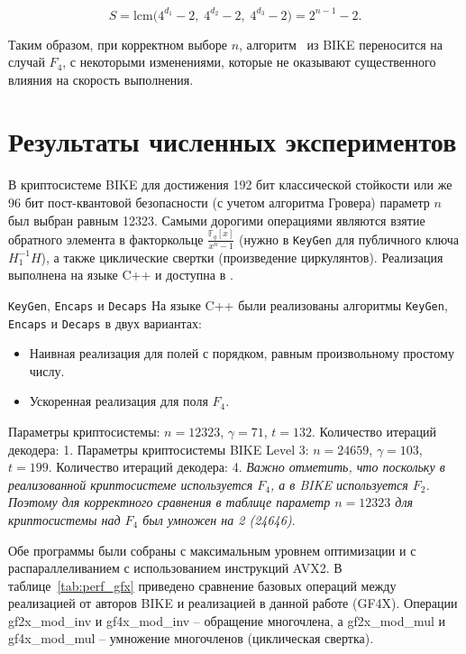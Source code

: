 \documentclass[14pt]{mmcs_article}
\theoremstyle{break}
\begin{document}
\begin{equation}
    S = \mathrm{lcm}\!\bigl(4^{d_1} - 2,\; 4^{d_2} - 2,\; 4^{d_3} - 2\bigr) = 2^{n-1} - 2.
\end{equation}

Таким образом, при корректном выборе $n$, алгоритм~\cite{drucker-fast-polynomial-inversion} из BIKE переносится на случай $F_4$, с некоторыми изменениями, которые не оказывают существенного влияния на скорость выполнения.

\section{Результаты численных экспериментов}
\label{sec7}

В криптосистеме BIKE для достижения 192 бит классической стойкости или же 96 бит пост-квантовой безопасности (с учетом алгоритма Гровера) параметр $n$ был выбран равным 12323. Самыми дорогими операциями являются взятие обратного элемента в факторкольце $\frac{\mathbb{F}_q[x]}{x^n - 1}$ (нужно в \texttt{KeyGen} для публичного ключа $H^{-1}_1 H$), а также циклические свертки (произведение циркулянтов). Реализация выполнена на языке C++ и доступна в \cite{github-repo}.

\texttt{KeyGen}, \texttt{Encaps} и \texttt{Decaps}
На языке C++ были реализованы алгоритмы \texttt{KeyGen}, \texttt{Encaps} и \texttt{Decaps} в двух вариантах:

\begin{itemize}
    \item Наивная реализация для полей с порядком, равным произвольному простому числу.
    \item Ускоренная реализация для поля $F_4$.
\end{itemize}

Параметры криптосистемы: $n = 12323$, $\gamma = 71$, $t = 132$. Количество итераций декодера: 1. Параметры криптосистемы BIKE Level 3: $n = 24659$, $\gamma = 103$, $t = 199$. Количество итераций декодера: 4. \emph{Важно отметить, что поскольку в реализованной криптосистеме используется $F_4$, а в BIKE используется $F_2$. Поэтому для корректного сравнения в таблице параметр $n = 12323$ для криптосистемы над $F_4$ был умножен на 2 (24646)}.

Обе программы были собраны с максимальным уровнем оптимизации и с распараллеливанием с использованием инструкций AVX2. В таблице~\ref{tab:perf_gfx} приведено сравнение базовых операций между реализацией от авторов BIKE и реализацией в данной работе (GF4X). Операции gf2x\_mod\_inv и gf4x\_mod\_inv -- обращение многочлена, а gf2x\_mod\_mul и gf4x\_mod\_mul -- умножение многочленов (циклическая свертка).
\end{document}
